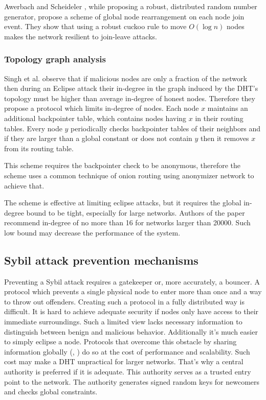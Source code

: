   Awerbach and Scheideler \cite{awe10}, while proposing a robust, distributed
  random number generator, propose a scheme of global node rearrangement on each
  node join event. They show that using a robust cuckoo rule to move $O(\log n)$
  nodes makes the network resilient to join-leave attacks.

  \subsubsection{Topology graph analysis}
  Singh et al. \cite{sin06} observe that if malicious nodes are only a fraction
  of the network then during an Eclipse attack their in-degree in the graph
  induced by the DHT's topology must be higher than average in-degree of honest
  nodes.
  Therefore they propose a protocol which limits in-degree of nodes.
  Each node $x$ maintains an additional backpointer table, which contains nodes
  having $x$ in their routing tables.
  Every node $y$ periodically checks backpointer tables of their neighbors and
  if they are larger than a global constant or does not contain $y$ then it
  removes $x$ from its routing table.

  This scheme requires the backpointer check to be anonymous, therefore the
  scheme uses a common technique of onion routing using anonymizer network to
  achieve that.

  The scheme is effective at limiting eclipse attacks, but it requires the
  global in-degree bound to be tight, especially for large networks. Authors of
  the paper recommend in-degree of no more than 16 for networks larger than
  20000. Such low bound may decrease the performance of the system.

\subsection{Sybil attack prevention mechanisms}
  Preventing a Sybil attack requires a gatekeeper or, more accurately, a
  bouncer.
  A protocol which prevents a single physical node to enter more than once and a
  way to throw out offenders.
  Creating such a protocol in a fully distributed way is difficult.
  It is hard to achieve adequate security if nodes only have access to their
  immediate surroundings.
  Such a limited view lacks necessary information to distinguish between benign
  and malicious behavior.
  Additionally it's much easier to simply eclipse a node. Protocols that
  overcome this obstacle by sharing information globally (\cite{cas02},
  \cite{wan05}) do so at the cost of performance and scalability. Such cost
  may make a DHT unpractical for larger networks. That's why a central authority
  is preferred if it is adequate. This authority serves as a trusted entry point
  to the network. The authority generates signed random keys for newcomers and
  checks global constraints.

